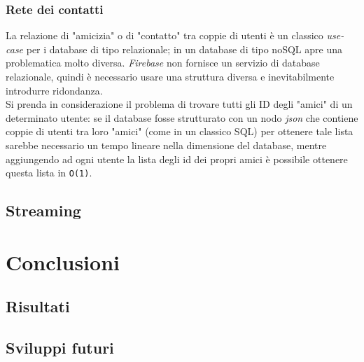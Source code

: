 \documentclass[conference]{IEEEtran}
\begin{document}
		\subsubsection{Rete dei contatti}
			La relazione di "amicizia" o di "contatto" tra coppie di utenti è un classico \textit{use-case} per i database di tipo
			relazionale; in un database di tipo noSQL apre una problematica molto diversa. \textit{Firebase} non fornisce
			un servizio di database relazionale, quindi è necessario usare una struttura diversa e inevitabilmente introdurre
			ridondanza.\\
			Si prenda in considerazione il problema di trovare tutti gli ID degli "amici" di un determinato utente:
			se il database fosse strutturato con un nodo \textit{json} che contiene coppie di utenti tra loro "amici" (come in un classico SQL)
			per ottenere tale lista sarebbe necessario un tempo lineare nella dimensione del database, mentre aggiungendo ad ogni utente
			la lista degli id dei propri amici è possibile ottenere questa lista in \texttt{O(1)}.


	\subsection{Streaming}





\section{Conclusioni}
	
	\subsection{Risultati}

	\subsection{Sviluppi futuri}

	




%
%
\end{document}
